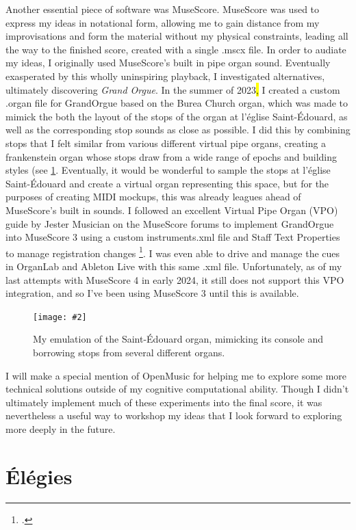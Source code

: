 \documentclass[12pt,twoside,maitrise]{dms_ks}
\newcommand{\customincludegraphics}[4][]{%
    \begin{figure}[H]
        \centering
        \texttt{[image: \#2]}
        \caption{#4}
	\label{#3} 
    \end{figure}
}
\theoremstyle{definition}
\begin{document}
{Another essential piece of software was MuseScore. 
MuseScore was used to express my ideas in notational form, allowing me to gain distance from my improvisations and form the material without my physical constraints, leading all the way to the finished score, created with a single .mscx file. 
In order to audiate my ideas, I originally used MuseScore's built in pipe organ sound. 
Eventually exasperated by this wholly uninspiring playback, I investigated alternatives, ultimately discovering \textit{Grand Orgue}. 
In the summer of 2023\hl{,} I created a custom .organ file for GrandOrgue based on the Burea Church organ, which was made to mimick the both the layout of the stops of the organ at l'église Saint-Édouard, as well as the corresponding stop sounds as close as possible. 
I did this by combining stops that I felt similar from various different virtual pipe organs, creating a frankenstein organ whose stops draw from a wide range of epochs and building styles (see \cref{fig:grand_orgue}. 
Eventually, it would be wonderful to sample the stops at l'église Saint-Édouard and create a virtual organ representing this space, but for the purposes of creating MIDI mockups, this was already leagues ahead of MuseScore's built in sounds. 
I followed an excellent Virtual Pipe Organ (VPO) guide by Jester Musician on the MuseScore forums to implement GrandOrgue into MuseScore 3 using a custom instruments.xml file and Staff Text Properties to manage registration changes \footcite{musician_jester_how_2018}. 
I was even able to drive and manage the cues in OrganLab and Ableton Live with this same .xml file. 
Unfortunately, as of my last attempts with MuseScore 4 in early 2024, it still does not support this VPO integration, and so I've been using MuseScore 3 until this is available.

\customincludegraphics[scale=0.3]{grand_orgue.png}{fig:grand_orgue}{My emulation of the Saint-Édouard organ, mimicking its console and borrowing stops from several different organs.}

I will make a special mention of OpenMusic for helping me to explore some more technical solutions outside of my cognitive computational ability. 
Though I didn't ultimately implement much of these experiments into the final score, it was nevertheless a useful way to workshop my ideas that I look forward to exploring more deeply in the future.

\chapter{Élégies}

}
\end{document}
